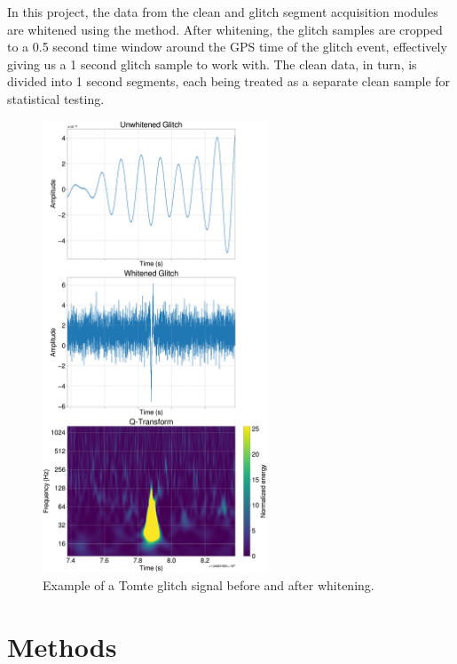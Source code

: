 \documentclass[12pt]{article}
\begin{document}
\medskip
\noindent In this project, the data from the clean and glitch segment acquisition modules are whitened using the method. After whitening, the glitch samples are cropped to a 0.5 second time window around the GPS time of the glitch event, effectively giving us a 1 second glitch sample to work with. The clean data, in turn, is divided into 1 second segments, each being treated as a separate clean sample for statistical testing.

\begin{figure}[H]
  \centering
  \includegraphics[width=0.6\textwidth]{images/sample_plot.pdf}
  \caption{Example of a Tomte glitch signal before and after whitening.}
  \label{fig:sampletomte}
\end{figure}

\section{Methods}\label{Methods}

\end{document}
